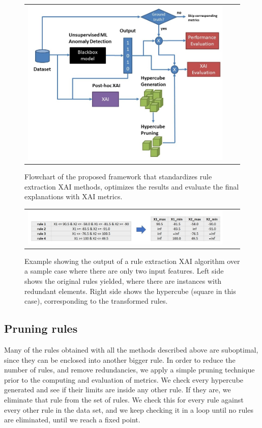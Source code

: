 \begin{figure}[h!]
\centering
  \begin{tabular}{c@{\qquad}c@{\qquad}c}
\includegraphics[width=0.80\columnwidth]{figures/chapter4_RuleExtraction/flowchartRULEX_notitle.jpg}
  \end{tabular} 
  \caption{Flowchart of the proposed framework that standardizes rule extraction XAI methods, optimizes the results and evaluate the final explanations with XAI  metrics.\label{fig:ch4-flowchartRULEX}}
\end{figure}


\begin{figure}[h!]
\centering
  \begin{tabular}{c@{\qquad}c@{\qquad}c}
\includegraphics[width=0.95\columnwidth]{figures/chapter4_RuleExtraction/RuleFormatNotHomog4.JPG}
  \end{tabular} 
  \caption{Example showing the output of a rule extraction XAI algorithm over a sample case where there are only two input features. Left side shows the original rules yielded, where there are instances with redundant elements. Right side shows the hypercube (square in this case), corresponding to the transformed rules.\label{fig:ch4-format-not-homog}}
\end{figure}


\subsection{Pruning rules}\label{subsec:RuleExtractionPruning}
Many of the rules obtained with all the methods described above are suboptimal, since they can be enclosed into another bigger rule. In order to reduce the number of rules, and remove redundancies, we apply a simple pruning technique prior to the computing and evaluation of metrics.
We check every hypercube generated and see if their limits are inside any other rule. If they are, we eliminate that rule from the set of rules. We check this for every rule against every other rule in the data set, and we keep checking it in a loop until no rules are eliminated, until we reach a fixed point.

